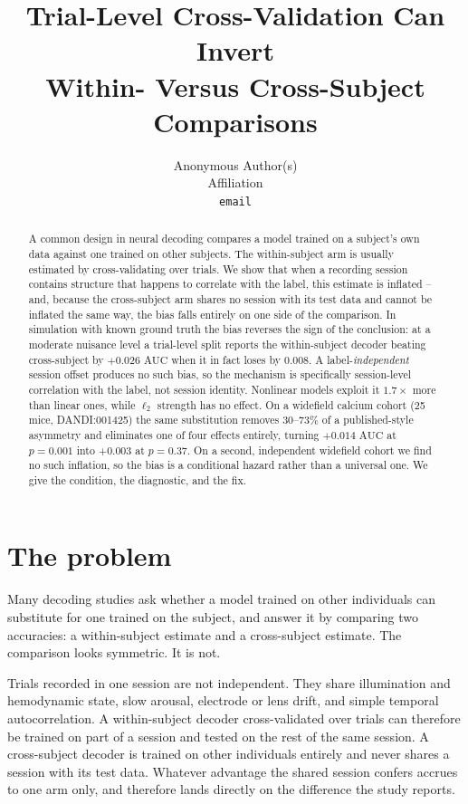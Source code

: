 \documentclass{article}
\title{Trial-Level Cross-Validation Can Invert\\
Within- Versus Cross-Subject Comparisons}
\author{%
  Anonymous Author(s)\\
  Affiliation\\
  \texttt{email}\\
}
\newcommand{\auc}{\mathrm{AUC}}
\begin{document}
\maketitle

\begin{abstract}
A common design in neural decoding compares a model trained on a subject's own data against one
trained on other subjects. The within-subject arm is usually estimated by cross-validating over
trials. We show that when a recording session contains structure that happens to correlate with the
label, this estimate is inflated -- and, because the cross-subject arm shares no session with its
test data and cannot be inflated the same way, the bias falls entirely on one side of the
comparison. In simulation with known ground truth the bias reverses the sign of the conclusion: at a
moderate nuisance level a trial-level split reports the within-subject decoder beating cross-subject
by $+0.026$ $\auc$ when it in fact loses by $0.008$. A label-\emph{independent} session offset
produces no such bias, so the mechanism is specifically session-level correlation with the label, not
session identity. Nonlinear models exploit it $1.7\times$ more than linear ones, while $\ell_2$
strength has no effect. On a widefield calcium cohort (25 mice, DANDI:001425) the same substitution
removes $30$--$73\%$ of a published-style asymmetry and eliminates one of four effects entirely,
turning $+0.014$ $\auc$ at $p = 0.001$ into $+0.003$ at $p = 0.37$. On a second, independent
widefield cohort we find no such inflation, so the bias is a conditional hazard rather than a
universal one. We give the condition, the diagnostic, and the fix.
\end{abstract}

\section{The problem}
Many decoding studies ask whether a model trained on other individuals can substitute for one
trained on the subject, and answer it by comparing two accuracies: a within-subject estimate and a
cross-subject estimate. The comparison looks symmetric. It is not.

Trials recorded in one session are not independent. They share illumination and hemodynamic state,
slow arousal, electrode or lens drift, and simple temporal autocorrelation. A within-subject decoder
cross-validated over trials can therefore be trained on part of a session and tested on the rest of
the same session. A cross-subject decoder is trained on other individuals entirely and never shares
a session with its test data. Whatever advantage the shared session confers accrues to one arm only,
and therefore lands directly on the difference the study reports.
\end{document}
